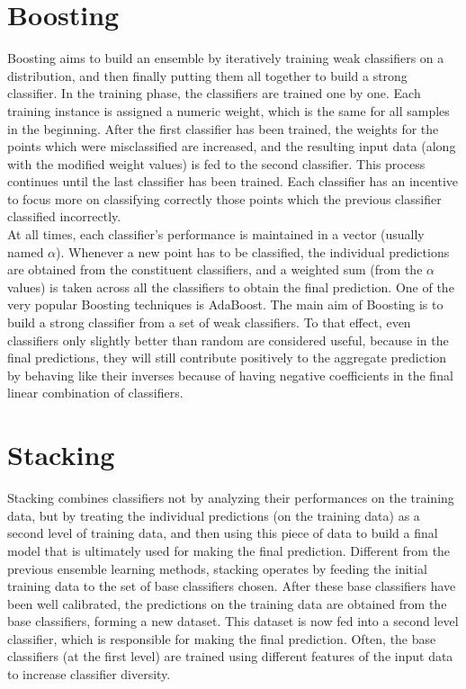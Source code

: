 \section{Boosting}
Boosting aims to build an ensemble by iteratively training weak classifiers on a distribution, and then finally putting them all together to build a strong classifier. In the training phase, the classifiers are trained one by one. Each training instance is assigned a numeric weight, which is the same for all samples in the beginning. After the first classifier has been trained, the weights for the points which were misclassified are increased, and the resulting input data (along with the modified weight values) is fed to the second classifier. This process continues until the last classifier has been trained. Each classifier has an incentive to focus more on classifying correctly those points which the previous classifier classified incorrectly.\\

At all times, each classifier's performance is maintained in a vector (usually named $\alpha$). Whenever a new point has to be classified, the individual predictions are obtained from the constituent classifiers, and a weighted sum (from the $\alpha$ values) is taken across all the classifiers to obtain the final prediction. One of the very popular Boosting techniques is AdaBoost. The main aim of Boosting is to build a strong classifier from a set of weak classifiers. To that effect, even classifiers only slightly better than random are considered useful, because in the final predictions, they will still contribute positively to the aggregate prediction by behaving like their inverses because of having negative coefficients in the final linear combination of classifiers.

\section{Stacking}
Stacking combines classifiers not by analyzing their performances on the training data, but by treating the individual predictions (on the training data) as a second level of training data, and then using this piece of data to build a final model that is ultimately used for making the final prediction. Different from the previous ensemble learning methods, stacking operates by feeding the initial training data to the set of base classifiers chosen. After these base classifiers have been well calibrated, the predictions on the training data are obtained from the base classifiers, forming a new dataset. This dataset is now fed into a second level classifier, which is responsible for making the final prediction. Often, the base classifiers (at the first level) are trained using different features of the input data to increase classifier diversity.\\


